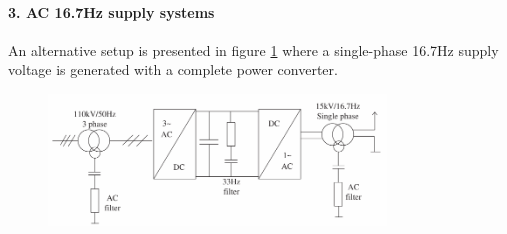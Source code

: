 \paragraph{3. AC 16.7Hz supply systems\\}
An alternative setup is presented in figure \ref{fig:abad2016e} where a single-phase 16.7Hz supply voltage is generated with a complete power converter. 

\begin{figure}[h!]
	\centering
	\begin{minipage}{.6\textwidth}
		\centering
		\includegraphics[width=0.8\textwidth,keepaspectratio]{figures/31.PowerS/abad2016e}
		\label{fig:abad2016e}
	\end{minipage}
\end{figure}


